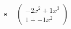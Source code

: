 \documentclass[preview]{standalone}
\begin{document}
\begin{align*}
\mathbf{s} = \begin{pmatrix}-2x^{2} + 1x^{3} \\ 1 + -1x^{2}\end{pmatrix}
\end{align*}
\end{document}
